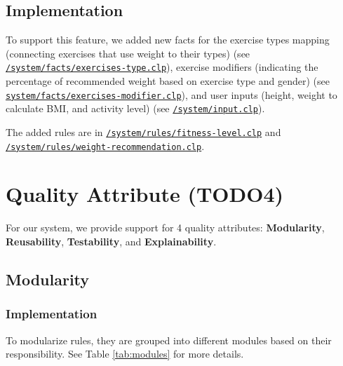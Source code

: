 \documentclass{article}
\begin{document}
\subsection{Implementation}
    
To support this feature, we added new facts for the exercise types mapping (connecting exercises that use weight to their types) (see \href{https://github.com/joshpham97/COMP474Project_OptionB_PhamTran_ExerciseRecommender/blob/main/system/facts/exercises-type.clp}{\texttt{/system/facts/exercises-type.clp}}),  exercise modifiers (indicating the percentage of recommended weight based on exercise type and gender) (see \href{https://github.com/joshpham97/COMP474Project_OptionB_PhamTran_ExerciseRecommender/blob/main/system/facts/exercises-modifier.clp}{\texttt{system/facts/exercises-modifier.clp}}), and user inputs (height, weight to calculate BMI, and activity level) (see \href{https://github.com/joshpham97/COMP474Project_OptionB_PhamTran_ExerciseRecommender/blob/main/system/input.clp#L15-L20}{\texttt{/system/input.clp}}). 

The added rules are in \href{https://github.com/joshpham97/COMP474Project_OptionB_PhamTran_ExerciseRecommender/blob/main/system/rules/fitness-level.clp}{\texttt{/system/rules/fitness-level.clp}} and \href{https://github.com/joshpham97/COMP474Project_OptionB_PhamTran_ExerciseRecommender/blob/main/system/rules/weight-recommendation.clp}{\texttt{/system/rules/weight-recommendation.clp}}.


\section{Quality Attribute (TODO4)}
    For our system, we provide support for 4 quality attributes: \textbf{Modularity}, \textbf{Reusability}, \textbf{Testability}, and \textbf{Explainability}.

\subsection{Modularity}

\subsubsection{Implementation}

To modularize rules, they are grouped into different modules based on their responsibility. See Table \ref{tab:modules} for more details.
\end{document}
